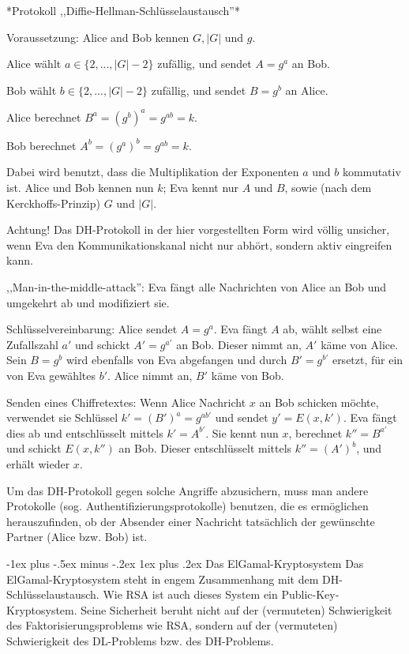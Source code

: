 \documentclass[a4paper]{article}
\makeatletter
\renewcommand{\subsubsection}{\@startsection{subsubsection}{3}{0mm}%
 {-1ex plus -.5ex minus -.2ex}%
 {1ex plus .2ex}%
 {\normalfont\small\bfseries}}
\makeatother
\begin{document}
\begin{multicols}{3}
        *Protokoll ,,Diffie-Hellman-Schlüsselaustausch''*
        \begin{itemize*}
            \item Voraussetzung: Alice and Bob kennen $G,|G|$ und $g$.
        \end{itemize*}
        \begin{enumerate*}
            \item Alice wählt $a\in\{2 ,...,|G|- 2\}$ zufällig, und sendet $A=g^a$ an Bob.
            \item Bob wählt $b\in\{2 ,...,|G|-2\}$ zufällig, und sendet $B=g^b$ an Alice.
            \item Alice berechnet $B^a= (g^b)^a=g^{ab}=k$.
            \item Bob berechnet $A^b= (g^a)^b=g^{ab}=k$.
        \end{enumerate*}

        Dabei wird benutzt, dass die Multiplikation der Exponenten $a$ und $b$ kommutativ ist. Alice und Bob kennen nun $k$; Eva kennt nur $A$ und $B$, sowie (nach dem Kerckhoffs-Prinzip) $G$ und $|G|$.

        Achtung! Das DH-Protokoll in der hier vorgestellten Form wird völlig unsicher, wenn Eva den Kommunikationskanal nicht nur abhört, sondern aktiv eingreifen kann.

        ,,Man-in-the-middle-attack'': Eva fängt alle Nachrichten von Alice an Bob und umgekehrt ab und modifiziert sie.

        Schlüsselvereinbarung: Alice sendet $A=g^a$. Eva fängt $A$ ab, wählt selbst eine Zufallszahl $a'$ und schickt $A'=g^{a'}$ an Bob. Dieser nimmt an, $A'$ käme von Alice. Sein $B=g^b$ wird ebenfalls von Eva abgefangen und durch $B'=g^{b'}$ ersetzt, für ein von Eva gewähltes $b'$. Alice nimmt an, $B'$ käme von Bob.

        Senden eines Chiffretextes: Wenn Alice Nachricht $x$ an Bob schicken möchte, verwendet sie Schlüssel $k'= (B')^a=g^{ab'}$ und sendet $y'=E(x,k')$. Eva fängt dies ab und entschlüsselt mittels $k'=A^{b'}$. Sie kennt nun $x$, berechnet $k''=B^{a'}$ und schickt $E(x,k'')$ an Bob. Dieser entschlüsselt mittels $k''= (A')^b$, und erhält wieder $x$.

        Um das DH-Protokoll gegen solche Angriffe abzusichern, muss man andere Protokolle (sog. Authentifizierungsprotokolle) benutzen, die es ermöglichen herauszufinden, ob der Absender einer Nachricht tatsächlich der gewünschte Partner (Alice bzw. Bob) ist.

        \subsubsection{Das ElGamal-Kryptosystem}
        Das ElGamal-Kryptosystem steht in engem Zusammenhang mit dem DH-Schlüsselaustausch. Wie RSA ist auch dieses System ein Public-Key-Kryptosystem. Seine Sicherheit beruht nicht auf der (vermuteten) Schwierigkeit des Faktorisierungsproblems wie RSA, sondern auf der (vermuteten) Schwierigkeit des DL-Problems bzw. des DH-Problems.


\end{multicols}
\end{document}
